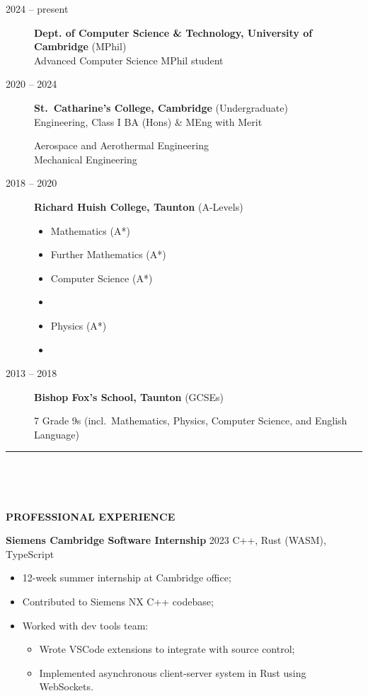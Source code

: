 \documentclass[
  11pt,
  a4paper,
]{article}
\providecommand{\tightlist}{%
  \setlength{\itemsep}{0pt}\setlength{\parskip}{0pt}}
\newcommand{\itemspace}{0.8ex}
\newcommand{\ruledheader}[2]{%
\begingroup
\setlength{\fboxsep}{0pt}%
\colorbox{#1}{%
\parbox[b][1.2ex][t]{35mm}{\begin{tiny}\ \end{tiny}}}%
\parbox[b][1.2ex][t]{5mm}{\begin{tiny}\ \end{tiny}}%
\uppercase{\textbf{#2}}
\endgroup}
\begin{document}
\begin{description}
\item[2024 – present]
\textbf{Dept. of Computer Science \& Technology, University of
Cambridge} (MPhil)\\
Advanced Computer Science MPhil student
\item[2020 – 2024]
\textbf{St.~Catharine’s College, Cambridge} (Undergraduate)\\
Engineering, Class I BA (Hons) \& MEng with Merit

Aerospace and Aerothermal Engineering\\
Mechanical Engineering
\item[2018 – 2020]
\textbf{Richard Huish College, Taunton} (A-Levels)

\begingroup
\begin{multicols}{3}

\begin{itemize}
\tightlist
\item
  Mathematics (A*)
\item
  Further Mathematics (A*)
\item
  Computer Science (A*)
\item
\item
  Physics (A*)
\item
\end{itemize}

\end{multicols}
\vspace{-\parskip}\endgroup
\item[2013 – 2018]
\textbf{Bishop Fox’s School, Taunton} (GCSEs)

7 Grade 9s (incl.~Mathematics, Physics, Computer Science, and English
Language)
\end{description}

\begin{Large}

\vspace{-1.5ex}\rule{\textwidth}{0.8pt}\vspace{2ex}

\ruledheader{cyan!50!teal}{Professional experience}\end{Large}

\vspace{\itemspace}

\textbf{Siemens Cambridge Software Internship} \textbar{} 2023
\textbar{} C++, Rust (WASM), TypeScript

\begin{itemize}
\tightlist
\item
  12-week summer internship at Cambridge office;
\item
  Contributed to Siemens NX C++ codebase;
\item
  Worked with dev tools team:

  \begin{itemize}
  \tightlist
  \item
    Wrote VSCode extensions to integrate with source control;
  \item
    Implemented asynchronous client-server system in Rust using
    WebSockets.
  \end{itemize}
\end{itemize}
\end{document}
